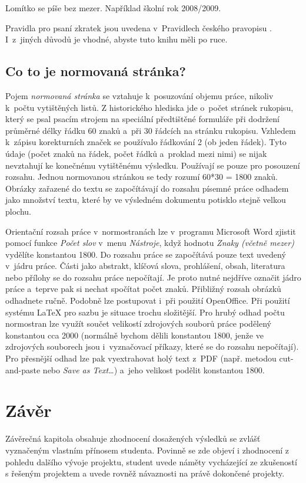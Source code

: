 Lomítko se píše bez mezer. Například školní rok 2008/2009.

Pravidla pro psaní zkratek jsou uvedena v~Pravidlech českého pravopisu \cite{Pravidla}. I~z~jiných důvodů je vhodné, abyste tuto knihu měli po ruce. 


\section{Co to je normovaná stránka?}
Pojem {\it normovaná stránka} se vztahuje k~posuzování objemu práce, nikoliv k~počtu vytištěných listů. Z historického hlediska jde o~počet stránek rukopisu, který se psal psacím strojem na speciální předtištěné formuláře při dodržení průměrné délky řádku 60 znaků a~při 30 řádcích na stránku rukopisu. Vzhledem k~zápisu korekturních značek se používalo řádkování 2 (ob jeden řádek). Tyto údaje (počet znaků na řádek, počet řádků a~proklad mezi nimi) se nijak nevztahují ke konečnému vytištěnému výsledku. Používají se pouze pro posouzení rozsahu. Jednou normovanou stránkou se tedy rozumí 60*30 = 1800 znaků. Obrázky zařazené do textu se započítávají do rozsahu písemné práce odhadem jako množství textu, které by ve výsledném dokumentu potisklo stejně velkou plochu.

Orientační rozsah práce v~normostranách lze v~programu Microsoft Word zjistit pomocí funkce {\it Počet slov} v~menu {\it Nástroje}, když hodnotu {\it Znaky (včetně mezer)} vydělíte konstantou 1800. Do rozsahu práce se započítává pouze text uvedený v~jádru práce. Části jako abstrakt, klíčová slova, prohlášení, obsah, literatura nebo přílohy se do rozsahu práce nepočítají. Je proto nutné nejdříve označit jádro práce a~teprve pak si nechat spočítat počet znaků. Přibližný rozsah obrázků odhadnete ručně. Podobně lze postupovat i~při použití OpenOffice. Při použití systému LaTeX pro sazbu je situace trochu složitější. Pro hrubý odhad počtu normostran lze využít součet velikostí zdrojových souborů práce podělený konstantou cca 2000 (normálně bychom dělili konstantou 1800, jenže ve zdrojových souborech jsou i~vyznačovací příkazy, které se do rozsahu nepočítají). Pro přesnější odhad lze pak vyextrahovat holý text z~PDF (např. metodou cut-and-paste nebo {\it Save as Text\ldots}) a~jeho velikost podělit konstantou 1800. 


\chapter{Závěr}
Závěrečná kapitola obsahuje zhodnocení dosažených výsledků se zvlášť vyznačeným vlastním přínosem studenta. Povinně se zde objeví i zhodnocení z pohledu dalšího vývoje projektu, student uvede náměty vycházející ze zkušeností s řešeným projektem a uvede rovněž návaznosti na právě dokončené projekty.

